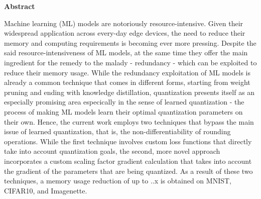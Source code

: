\thispagestyle{empty}
\vspace*{1.0cm}

\begin{center}
    \textbf{Abstract} \label{abstract}
\end{center}

\vspace*{0.5cm}

\noindent Machine learning (ML) models are notoriously resource-intensive.
Given their widespread application across every-day edge devices,
the need to reduce their memory and computing requirements is becoming ever more pressing.
Despite the said resource-intensiveness of ML models, at the same time 
they offer the main ingredient for the remedy to the malady - redundancy - 
which can be exploited to reduce their memory usage.
While the redundancy exploitation of ML models is already a common 
technique that comes in different forms, starting from weight pruning \cite{han2016deepcompression} and
ending with knowledge distillation, quantization presents itself as an especially promising 
area especically in the sense of learned quantization - 
the process of making ML models learn their optimal quantization parameters
on their own.
Hence, the current work employs two techniques that bypass the main issue of learned quantization,
that is, the non-differentiability of rounding operations.
While the first technique involves custom loss functions that directly take into account
quantization goals, the second, more novel approach incorporates a custom scaling factor gradient calculation that takes into account 
the gradient of the parameters that are being quantized.
As a result of these two techniques, a memory usage reduction of up to ..x is obtained 
on MNIST, CIFAR10, and Imagenette. 